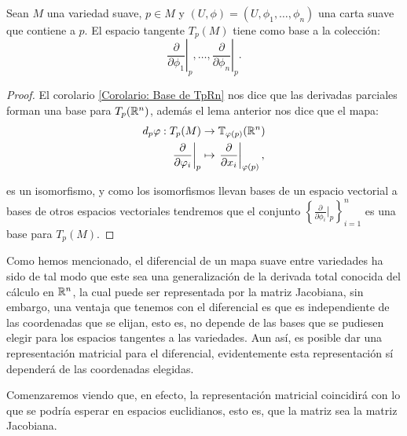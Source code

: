 \begin{theorem}\label{Teorema: Base para el espacio tangente}
	Sean $M$ una variedad suave, $p \in M$ y $(U,\phi) = (U, \phi_1, \dots, \phi_n)$ una carta suave que contiene a $p$. El espacio tangente $T_p(M)$ tiene como base a la colección:
	\[
		\left. \frac{\partial}{\partial \phi_1} \right|_p, \hdots, \left. \frac{\partial}{\partial \phi_n} \right|_p .
	\]
\end{theorem}

\begin{proof}
	El corolario \ref{Corolario: Base de TpRn} nos dice que las derivadas parciales forman una base para $T_p(\mathbb{R}^n)$, además el lema anterior nos dice que el mapa:
	\begin{align*}
		d_p\varphi: T_p(M)                                     & \to \mathbb{T}_{\varphi(p)} (\mathbb{R}^n) \\
		\left. \frac{\partial}{\partial \varphi_i} \right|_{p} & \mapsto
		\left. \frac{\partial}{\partial x_i} \right|_{\varphi(p)},
	\end{align*}

	es un isomorfismo, y como los isomorfismos llevan bases de un espacio vectorial a bases de otros espacios vectoriales tendremos que el conjunto $\left\{ \frac{\partial}{\partial \phi_{i}}|_{p} \right\}_{i=1}^{n}$ es una base para $T_{p}(M)$.
\end{proof}

Como hemos mencionado, el diferencial de un mapa suave entre variedades ha sido de tal modo que este sea una generalización de la derivada total conocida del cálculo en $\mathbb{R}^n$, la cual puede ser representada por la matriz Jacobiana, sin embargo, una ventaja que tenemos con el diferencial es que es independiente de las coordenadas que se elijan, esto es, no depende de las bases que se pudiesen elegir para los espacios tangentes a las variedades. Aun así, es posible dar una representación matricial para el diferencial, evidentemente esta representación sí dependerá de las coordenadas elegidas.

Comenzaremos viendo que, en efecto, la representación matricial coincidirá con lo que se podría esperar en espacios euclidianos, esto es, que la matriz sea la matriz Jacobiana.

